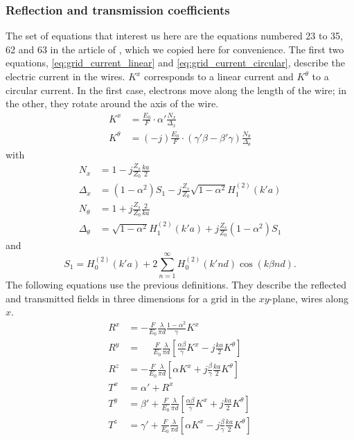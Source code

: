 \subsubsection{Reflection and transmission coefficients}
The set of equations that interest us here are the equations numbered 23 to 35, 62 and 63 in the article of \citeauthor{houde_2001} \cite{houde_2001}, which we copied here for convenience.
The first two equations, \eqref{eq:grid_current_linear} and \eqref{eq:grid_current_circular}, describe the electric current in the wires.
$K^x$ corresponds to a linear current and $K^\theta$ to a circular current.
In the first case, electrons move along the length of the wire; in the other, they rotate around the axis of the wire.
\begin{align}
    K^x &= \frac{E_0}{F} \cdot \alpha' \frac{N_x}{\Delta_x}
    \label{eq:grid_current_linear}
    \\
    K^\theta &= (-j) \frac{E_0}{F} \cdot (\gamma' \beta - \beta' \gamma) \frac{N_\theta}{\Delta_\theta}
    \label{eq:grid_current_circular}
\end{align}
with
\begin{align}
    N_x
    &=
    1 - j \frac{Z_s}{Z_0} \frac{ka}{2}
    \\
    \Delta_x
    &=
    (1 - \alpha^2) S_1 - j \frac{Z_s}{Z_0} \sqrt{1 - \alpha^2}H_1^{(2)} (k'a)
    \\
    N_\theta
    &=
    1 + j \frac{Z_s}{Z_0} \frac{2}{ka}
    \\
    \Delta_\theta
    &=
    \sqrt{1 - \alpha^2} H_1^{(2)} (k'a) + j \frac{Z_s}{Z_0} (1 - \alpha^2) S_1
\end{align}
and
\begin{equation}
    S_1 = H_0^{(2)} (k'a) + 2
    \sum_{n=1}^\infty
    H_0^{(2)}(k'nd) \cos (k \beta nd)
    \text{.}
    \label{eq:infinite_hankel}
\end{equation}
The following equations use the previous definitions.
They describe the reflected and transmitted fields in three dimensions for a grid in the $xy$-plane, wires along~$x$.
\begin{align}
    R^x
    &=
    -\frac{F}{E_0}
    \frac{\lambda}{\pi d}
    \frac{1 - \alpha^2}{\gamma} K^x
    \label{eq:houde_Rx}
    \\
    R^y
    &=
    \phantom{-}
    \frac{F}{E_0}
    \frac{\lambda}{\pi d}
    \left[
        \frac{\alpha \beta}{\gamma} K^x
        -
        j \frac{ka}{2} K^\theta
    \right]
    \\
    R^z
    &=
    -\frac{F}{E_0}
    \frac{\lambda}{\pi d}
    \left[
       \alpha K^x
       +
       j \frac{\beta}{\gamma} \frac{ka}{2} K^\theta
    \right]
    \\
    T^x &= \alpha' + R^x
    \\
    T^y
    &=
    \beta' +
    \frac{F}{E_0}
    \frac{\lambda}{\pi d}
    \left[
        \frac{\alpha \beta}{\gamma} K^x + j \frac{ka}{2} K^\theta
    \right]
    \\
    T^z
    &=
    \gamma' +
    \frac{F}{E_0}
    \frac{\lambda}{\pi d}
    \left[
        \alpha K^x - j \frac{\beta}{\gamma} \frac{ka}{2} K^\theta
    \right]
\end{align}

